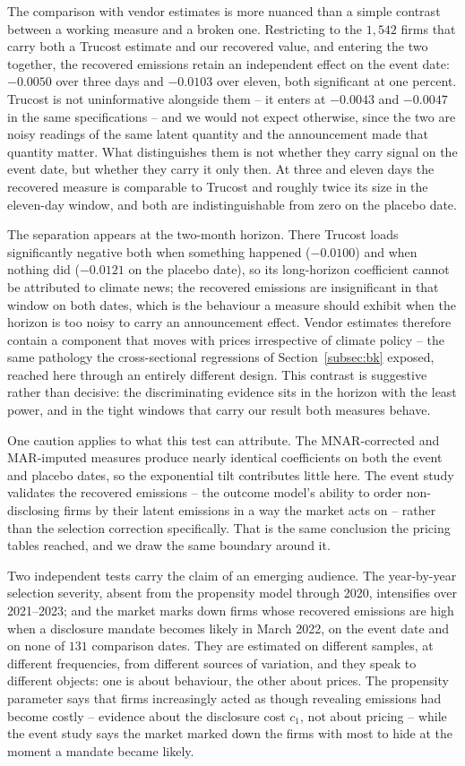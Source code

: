 \documentclass[a4paper,12pt]{article}
\begin{document}
The comparison with vendor estimates is more nuanced than a simple contrast between a working measure and a broken one. Restricting to the $1{,}542$ firms that carry both a Trucost estimate and our recovered value, and entering the two together, the recovered emissions retain an independent effect on the event date: $-0.0050$ over three days and $-0.0103$ over eleven, both significant at one percent. Trucost is not uninformative alongside them -- it enters at $-0.0043$ and $-0.0047$ in the same specifications -- and we would not expect otherwise, since the two are noisy readings of the same latent quantity and the announcement made that quantity matter. What distinguishes them is not whether they carry signal on the event date, but whether they carry it only then. At three and eleven days the recovered measure is comparable to Trucost and roughly twice its size in the eleven-day window, and both are indistinguishable from zero on the placebo date.

The separation appears at the two-month horizon. There Trucost loads significantly negative both when something happened ($-0.0100$) and when nothing did ($-0.0121$ on the placebo date), so its long-horizon coefficient cannot be attributed to climate news; the recovered emissions are insignificant in that window on both dates, which is the behaviour a measure should exhibit when the horizon is too noisy to carry an announcement effect. Vendor estimates therefore contain a component that moves with prices irrespective of climate policy -- the same pathology the cross-sectional regressions of Section~\ref{subsec:bk} exposed, reached here through an entirely different design. This contrast is suggestive rather than decisive: the discriminating evidence sits in the horizon with the least power, and in the tight windows that carry our result both measures behave.

One caution applies to what this test can attribute. The MNAR-corrected and MAR-imputed measures produce nearly identical coefficients on both the event and placebo dates, so the exponential tilt contributes little here. The event study validates the recovered emissions -- the outcome model's ability to order non-disclosing firms by their latent emissions in a way the market acts on -- rather than the selection correction specifically. That is the same conclusion the pricing tables reached, and we draw the same boundary around it.

Two independent tests carry the claim of an emerging audience. The year-by-year selection severity, absent from the propensity model through 2020, intensifies over 2021--2023; and the market marks down firms whose recovered emissions are high when a disclosure mandate becomes likely in March 2022, on the event date and on none of $131$ comparison dates. They are estimated on different samples, at different frequencies, from different sources of variation, and they speak to different objects: one is about behaviour, the other about prices. The propensity parameter says that firms increasingly acted as though revealing emissions had become costly -- evidence about the disclosure cost $c_1$, not about pricing -- while the event study says the market marked down the firms with most to hide at the moment a mandate became likely.
\end{document}
